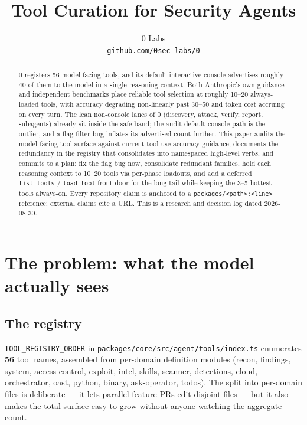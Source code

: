 \documentclass[11pt]{article}
\title{Tool Curation for Security Agents}
\author{
  0 Labs \\
  \texttt{github.com/0sec-labs/0}
}
\date{}
\begin{document}
\maketitle

\begin{abstract}
0 registers 56 model-facing tools, and its default interactive console
advertises roughly 40 of them to the model in a single reasoning context. Both
Anthropic's own guidance and independent benchmarks place reliable tool
selection at roughly 10--20 always-loaded tools, with accuracy degrading
non-linearly past 30--50 and token cost accruing on every turn. The lean
non-console lanes of 0 (discovery, attack, verify, report, subagents) already
sit inside the safe band; the audit-default console path is the outlier, and a
flag-filter bug inflates its advertised count further. This paper audits the
model-facing tool surface against current tool-use accuracy guidance, documents
the redundancy in the registry that consolidates into namespaced high-level
verbs, and commits to a plan: fix the flag bug now, consolidate redundant
families, hold each reasoning context to 10--20 tools via per-phase loadouts,
and add a deferred \texttt{list\_tools} / \texttt{load\_tool} front door for the
long tail while keeping the 3--5 hottest tools always-on. Every repository claim
is anchored to a \texttt{packages/<path>:<line>} reference; external claims cite
a URL. This is a research and decision log dated 2026-08-30.
\end{abstract}

\section{The problem: what the model actually sees}

\subsection{The registry}

\texttt{TOOL\_REGISTRY\_ORDER} in \texttt{packages/core/src/agent/tools/index.ts}
enumerates \textbf{56} tool names, assembled from per-domain definition modules
(recon, findings, system, access-control, exploit, intel, skills, scanner,
detections, cloud, orchestrator, oast, python, binary, ask-operator, todos). The
split into per-domain files is deliberate --- it lets parallel feature PRs edit
disjoint files --- but it also makes the total surface easy to grow without
anyone watching the aggregate count.
\end{document}
